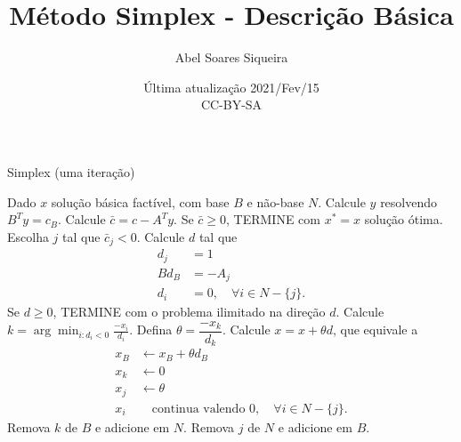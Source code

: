 \documentclass{article}
\author{Abel Soares Siqueira}
\title{Método Simplex - Descrição Básica}
\date{Última atualização 2021/Fev/15 \\ CC-BY-SA}
\begin{document}
  \maketitle

  \begin{algorithm}
    \caption{Simplex (uma iteração)}
    \begin{algorithmic}[1]
      \State Dado $x$ solução básica factível, com base $B$ e não-base $N$.
      \State Calcule $y$ resolvendo $B^T y = c_B$.
      \State Calcule $\bar{c} = c - A^T y$.
      \State Se $\bar{c} \geq 0$, TERMINE com $x^* = x$ solução ótima.
      \State Escolha $j$ tal que $\bar{c}_j < 0$.
      \State Calcule $d$ tal que
        \begin{align*}
          d_j & = 1 \\
          B d_B & = -A_j \\
          d_i & = 0, \quad \forall i \in N-\{j\}.
        \end{align*}
      \State Se $d \geq 0$, TERMINE com o problema ilimitado na direção $d$.
      \State Calcule $\displaystyle k = \arg\min_{i: d_i < 0} \frac{-x_i}{d_i}$.
      \State Defina $\theta = \dfrac{-x_k}{d_k}$.
      \State Calcule $x = x + \theta d$, que equivale a
      \begin{align*}
        x_B & \leftarrow x_B + \theta d_B \\
        x_k & \leftarrow 0 \\
        x_j & \leftarrow \theta \\
        x_i & \quad \text{continua valendo } 0, \quad \forall i \in N-\{j\}.
      \end{align*}
      \State Remova $k$ de $B$ e adicione em $N$.
      \State Remova $j$ de $N$ e adicione em $B$.
    \end{algorithmic}
  \end{algorithm}
\end{document}
